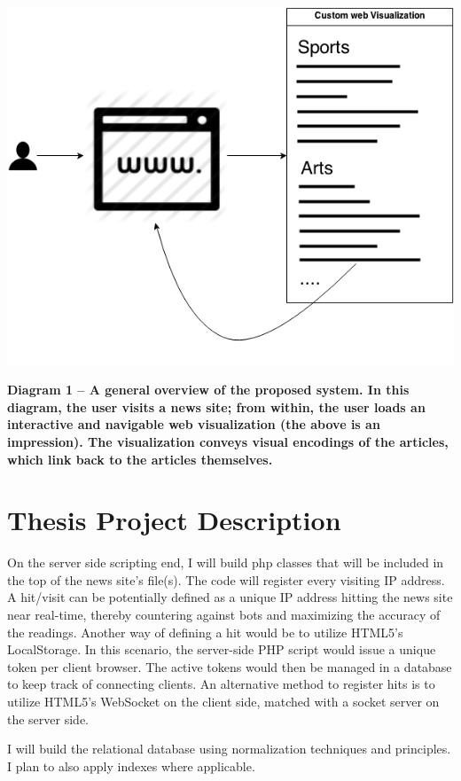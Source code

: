 \documentclass[12pt]{article}
\begin{document}
\includegraphics[scale=0.6]{img/overall_chart}

\noindent\textbf{Diagram 1 -- A general overview of the proposed system. In this diagram, the user visits a news site; from within, the user loads an interactive and navigable web visualization (the above is an impression). The visualization conveys visual encodings of the articles, which link back to the articles themselves.}

\vfill

\section{Thesis Project Description}
On the server side scripting end, I will build php classes that will be included in the top of the news site's file(s). The code will register every visiting IP address. A hit/visit can be potentially defined as a unique IP address hitting the news site near real-time, thereby countering against bots and maximizing the accuracy of the readings. Another way of defining a hit would be to utilize HTML5's LocalStorage. In this scenario, the server-side PHP script would issue a unique token per client browser. The active tokens would then be managed in a database to keep track of connecting clients. An alternative method to register hits is to utilize HTML5's WebSocket on the client side, matched with a socket server on the server side.

I will build the relational database using normalization techniques and principles. I plan to also apply indexes where applicable.
\end{document}
